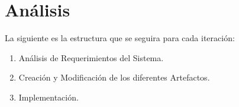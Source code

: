 \documentclass[]{article}
\begin{document}
				
				
				
				
				
				
				
                \pagebreak
				
				
				
				
				
				
				
				
				
				
				
				
				
				
				
				

				
				
				
        
\section{Análisis}
La siguiente es la estructura que se seguira para cada iteración:
\begin{enumerate}
        \item Análisis de Requerimientos del Sistema.
        \item Creación y Modificación de los diferentes Artefactos.
        \item Implementación.
\end{enumerate}
\end{document}
